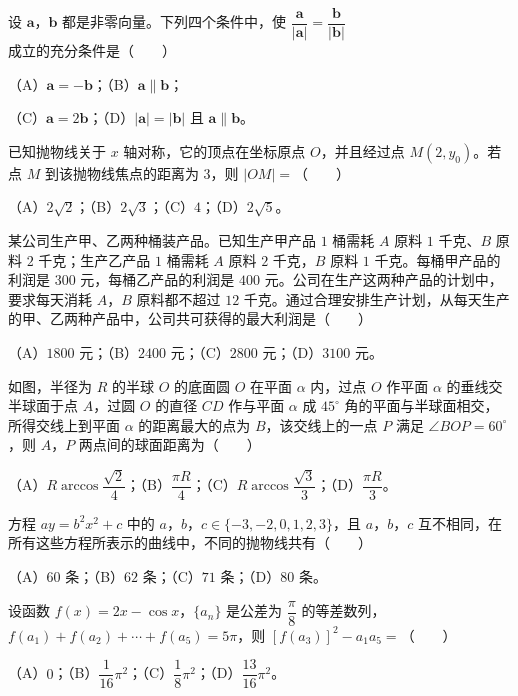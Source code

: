 \begin{question}
设 $\boldsymbol a$，$\boldsymbol b$ 都是非零向量。下列四个条件中，使 $\dfrac{\boldsymbol a}{|\boldsymbol a|}=\dfrac{\boldsymbol b}{|\boldsymbol b|}$ 成立的充分条件是\mbox{（　　）}

（A）$\boldsymbol a=-\boldsymbol b$；（B）$\boldsymbol a\parallel\boldsymbol b$；

（C）$\boldsymbol a=2\boldsymbol b$；（D）$|\boldsymbol a|=|\boldsymbol b|$ 且 $\boldsymbol a\parallel\boldsymbol b$。

\end{question}
\begin{question}
已知抛物线关于 $x$ 轴对称，它的顶点在坐标原点 $O$，并且经过点 $M(2,y_0)$。若点 $M$ 到该抛物线焦点的距离为 $3$，则 $|OM|=$\mbox{（　　）}

（A）$2\sqrt2$；（B）$2\sqrt3$；（C）$4$；（D）$2\sqrt5$。

\end{question}
\begin{question}
某公司生产甲、乙两种桶装产品。已知生产甲产品 $1$ 桶需耗 $A$ 原料 $1$ 千克、$B$ 原料 $2$ 千克；生产乙产品 $1$ 桶需耗 $A$ 原料 $2$ 千克，$B$ 原料 $1$ 千克。每桶甲产品的利润是 $300$ 元，每桶乙产品的利润是 $400$ 元。公司在生产这两种产品的计划中，要求每天消耗 $A$，$B$ 原料都不超过 $12$ 千克。通过合理安排生产计划，从每天生产的甲、乙两种产品中，公司共可获得的最大利润是\mbox{（　　）}

（A）$1800$ 元；（B）$2400$ 元；（C）$2800$ 元；（D）$3100$ 元。

\Needspace{0.4\textheight}
\end{question}
\begin{question}
如图，半径为 $R$ 的半球 $O$ 的底面圆 $O$ 在平面 $\alpha$ 内，过点 $O$ 作平面 $\alpha$ 的垂线交半球面于点 $A$，过圆 $O$ 的直径 $CD$ 作与平面 $\alpha$ 成 $45^\circ$ 角的平面与半球面相交，所得交线上到平面 $\alpha$ 的距离最大的点为 $B$，该交线上的一点 $P$ 满足 $\angle BOP=60^\circ$，则 $A$，$P$ 两点间的球面距离为\mbox{（　　）}
\nopagebreak[4]
\begin{center}\end{center}
\nopagebreak[4]
（A）$R\arccos\dfrac{\sqrt2}{4}$；（B）$\dfrac{\pi R}{4}$；（C）$R\arccos\dfrac{\sqrt3}{3}$；（D）$\dfrac{\pi R}{3}$。

\end{question}
\begin{question}
方程 $ay=b^2x^2+c$ 中的 $a$，$b$，$c\in\{-3,-2,0,1,2,3\}$，且 $a$，$b$，$c$ 互不相同，在所有这些方程所表示的曲线中，不同的抛物线共有\mbox{（　　）}

（A）$60$ 条；（B）$62$ 条；（C）$71$ 条；（D）$80$ 条。

\end{question}
\begin{question}
设函数 $f(x)=2x-\cos x$，$\{a_n\}$ 是公差为 $\dfrac\pi8$ 的等差数列，$f(a_1)+f(a_2)+\cdots+f(a_5)=5\pi$，则 $[f(a_3)]^2-a_1a_5=$\mbox{（　　）}

（A）$0$；（B）$\dfrac1{16}\pi^2$；（C）$\dfrac18\pi^2$；（D）$\dfrac{13}{16}\pi^2$。

\end{question}

